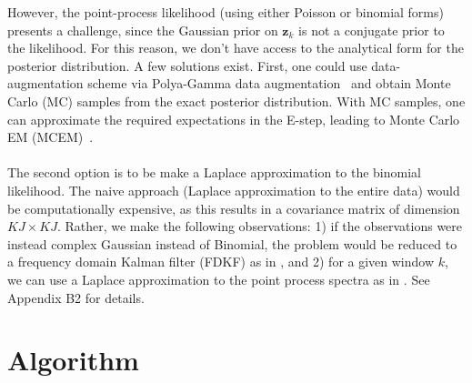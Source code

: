 \documentclass{article}
\def\*#1{\mathbf{#1}}
\begin{document}
However, the point-process likelihood (using either Poisson or binomial forms)
presents a challenge, since the Gaussian prior on $\*z_k$ is not a conjugate
prior to the likelihood. For this reason, we don't have access to the analytical
form for the posterior distribution. A few solutions exist. First, one could use
data-augmentation scheme via Polya-Gamma data augmentation~\cite{Polson13} and
obtain Monte Carlo (MC) samples from the exact posterior distribution. With MC
samples, one can approximate the required expectations in the E-step, leading to
Monte Carlo EM (MCEM)~\cite{Zhang18}.\\\\
The second option is to be make a Laplace approximation to the binomial
likelihood. The naive approach (Laplace approximation to the entire data) would
be computationally expensive, as this results in a covariance matrix of dimension
$KJ\times KJ$. Rather, we make the following observations: 1) if the
observations were instead complex Gaussian instead of Binomial, the problem
would be reduced to a frequency domain Kalman filter (FDKF) as in
\cite{Kim2018}, and 2) for a given window $k$, we can use a Laplace
approximation to the point process spectra as in \cite{Miran2017}. See Appendix
B2 for details. 
\newline

\section{Algorithm}
\end{document}
